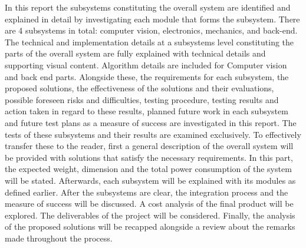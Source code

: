 In this report the subsystems constituting the overall system are identified and explained in detail by investigating each module that forms the subsystem. There are 4 subsystems in total: computer vision, electronics, mechanics, and back-end. The technical and implementation details at a subsystems level constituting the parts of the overall system are fully explained with technical details and supporting visual content. Algorithm details are included for Computer vision and back end parts. Alongside these, the requirements for each subsystem, the proposed solutions, the effectiveness of the solutions and their evaluations, possible foreseen risks and difficulties, testing procedure, testing results and action taken in regard to these results, planned future work in each subsystem and future test plans as a measure of success are investigated in this report. The tests of these subsystems and their results are examined exclusively. To effectively transfer these to the reader, first a general description of the overall system will be provided with solutions that satisfy the necessary requirements. In this part, the expected weight, dimension and the total power consumption of the system will be stated. Afterwards, each subsystem will be explained with its modules as defined earlier. After the subsystems are clear, the integration process and the measure of success will be discussed. A cost analysis of the final product will be explored. The deliverables of the project will be considered. Finally, the analysis of the proposed solutions will be recapped alongside a review about the remarks made throughout the process.  


    
